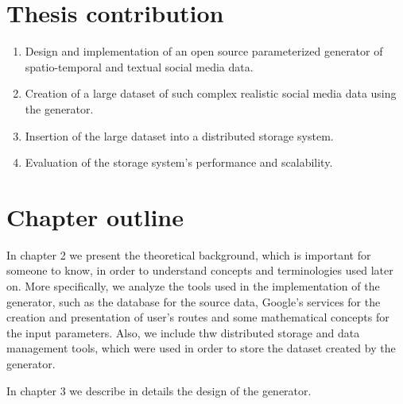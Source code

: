 \section{Thesis contribution}

\begin{enumerate}
  \item Design and implementation of an open source parameterized generator of spatio-temporal and textual social media data. 
  \item Creation of a large dataset of such complex realistic social media data using the generator.
  \item Insertion of the large dataset into a distributed storage system. 
  \item Evaluation of the storage system's performance and scalability.
\end{enumerate}

\section{Chapter outline}

In chapter 2 we present the theoretical background, which is important for someone to know, in order to understand concepts and terminologies used later on. 
More specifically, we analyze the tools used in the implementation of the generator, such as the database for the source data,
Google's services for the creation and presentation of user's routes and some mathematical concepts for the input parameters. Also,
we include thw distributed storage and data management tools, which were used in order to store the dataset created by the generator. 

In chapter 3 we describe in details the design of the generator.











